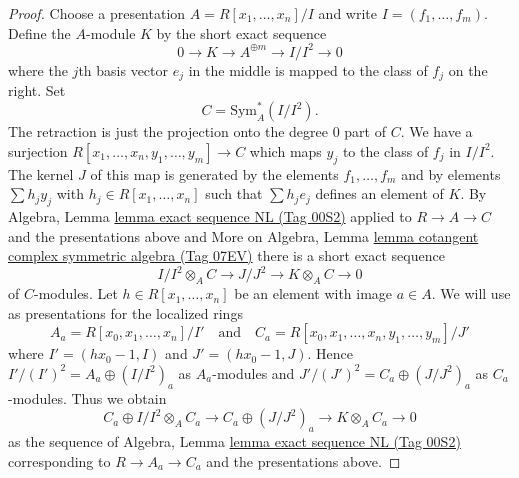 \documentclass{amsart}
\theoremstyle{plain}
\theoremstyle{definition}
\theoremstyle{remark}
\numberwithin{equation}{subsection}
\begin{document}
\begin{proof}
Choose a presentation $A = R[x_1, \ldots, x_n]/I$ and write
$I = (f_1, \ldots, f_m)$. Define the $A$-module $K$ by the short exact sequence
$$
0 \to K \to A^{\oplus m} \to I/I^2 \to 0
$$
where the $j$th basis vector $e_j$ in the middle is mapped to the class of
$f_j$ on the right. Set
$$
C = \text{Sym}^*_A(I/I^2).
$$
The retraction is just the projection onto the degree $0$ part of $C$.
We have a surjection $R[x_1, \ldots, x_n, y_1, \ldots, y_m] \to C$
which maps $y_j$ to the class of $f_j$ in $I/I^2$. The kernel $J$ of this
map is generated by the elements $f_1, \ldots, f_m$ and by elements
$\sum h_j y_j$ with $h_j \in R[x_1, \ldots, x_n]$ such that
$\sum h_j e_j$ defines an element of $K$. By
Algebra, Lemma \href{https://stacks.math.columbia.edu/tag/00S2}{lemma exact sequence NL (Tag 00S2)}
applied to $R \to A \to C$ and the presentations above and
More on Algebra, Lemma
\href{https://stacks.math.columbia.edu/tag/07EV}{lemma cotangent complex symmetric algebra (Tag 07EV)}
there is a short exact sequence
\begin{equation}
\label{equation-sequence}
I/I^2 \otimes_A C \to J/J^2 \to K \otimes_A C \to 0
\end{equation}
of $C$-modules. Let $h \in R[x_1, \ldots, x_n]$ be an element
with image $a \in A$. We will use as presentations for the localized rings
$$
A_a = R[x_0, x_1, \ldots, x_n]/I'
\quad\text{and}\quad
C_a = R[x_0, x_1, \ldots, x_n, y_1, \ldots, y_m]/J'
$$
where $I' = (hx_0 - 1, I)$ and $J' = (hx_0 - 1, J)$. Hence
$I'/(I')^2 = A_a \oplus (I/I^2)_a$ as $A_a$-modules and
$J'/(J')^2 = C_a \oplus (J/J^2)_a$ as $C_a$-modules.
Thus we obtain
\begin{equation}
\label{equation-sequence-localized}
C_a \oplus I/I^2 \otimes_A C_a \to
C_a \oplus (J/J^2)_a \to
K \otimes_A C_a \to 0
\end{equation}
as the sequence of
Algebra, Lemma \href{https://stacks.math.columbia.edu/tag/00S2}{lemma exact sequence NL (Tag 00S2)}
corresponding to $R \to A_a \to C_a$ and the presentations above.


\end{proof}
\end{document}
